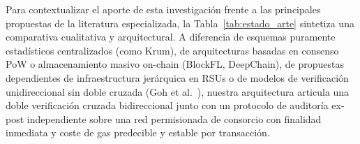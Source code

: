 Para contextualizar el aporte de esta investigación frente a las principales propuestas de la literatura especializada, la Tabla~\ref{tab:estado_arte} sintetiza una comparativa cualitativa y arquitectural. A diferencia de esquemas puramente estadísticos centralizados (como Krum), de arquitecturas basadas en consenso PoW o almacenamiento masivo on-chain (BlockFL, DeepChain), de propuestas dependientes de infraestructura jerárquica en RSUs o de modelos de verificación unidireccional sin doble cruzada (Goh et al.~\cite{goh2023blockchain}), nuestra arquitectura articula una doble verificación cruzada bidireccional junto con un protocolo de auditoría ex-post independiente sobre una red permisionada de consorcio con finalidad inmediata y coste de gas predecible y estable por transacción.


